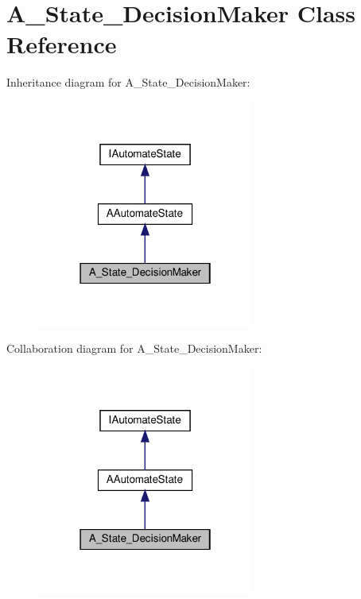 \hypertarget{classA__State__DecisionMaker}{}\section{A\+\_\+\+State\+\_\+\+Decision\+Maker Class Reference}
\label{classA__State__DecisionMaker}


Inheritance diagram for A\+\_\+\+State\+\_\+\+Decision\+Maker\+:
\nopagebreak
\begin{figure}[H]
\begin{center}
\leavevmode
\includegraphics[width=202pt]{classA__State__DecisionMaker__inherit__graph}
\end{center}
\end{figure}


Collaboration diagram for A\+\_\+\+State\+\_\+\+Decision\+Maker\+:
\nopagebreak
\begin{figure}[H]
\begin{center}
\leavevmode
\includegraphics[width=202pt]{classA__State__DecisionMaker__coll__graph}
\end{center}
\end{figure}
